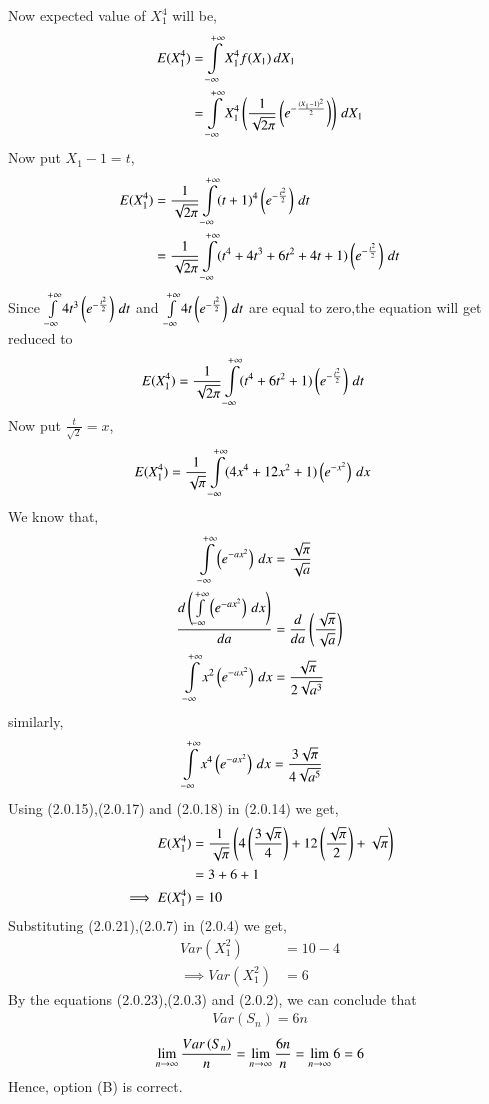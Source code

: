 \documentclass[journal,12pt,twocolumn]{IEEEtran}
\begin{document}
Now expected value of $X_{1}^{4}$ will be,
\begin{align}
   E(X_{1}^4)&=\int\limits_{-\infty}^{+\infty}X_{1}^{4}f(X_{1})\,dX_{1}
\\   &=\int\limits_{-\infty}^{+\infty}X_{1}^{4}\left(\frac{1}{\sqrt{2\pi}}\left(e^{-\frac{(X_{1}-1)^2}{2}}\right)\right)\,dX_{1}
\end{align}
Now put $X_{1}-1=t$,
\begin{align}
    E(X_{1}^4)&=\frac{1}{\sqrt{2\pi}}\int\limits_{-\infty}^{+\infty}(t+1)^{4}\left(e^{-\frac{t^{2}}{2}}\right)\,dt
\\ &=\frac{1}{\sqrt{2\pi}}\int\limits_{-\infty}^{+\infty}(t^{4}+4t^{3}+6t^{2}+4t+1)\left(e^{-\frac{t^{2}}{2}}\right)\,dt
\end{align}
Since $\int\limits_{-\infty}^{+\infty}4t^3\left(e^{-\frac{t^{2}}{2}}\right)\,dt$ and $\int\limits_{-\infty}^{+\infty}4t\left(e^{-\frac{t^{2}}{2}}\right)\,dt$ are equal to zero,the equation will get reduced to
\begin{align}
    E(X_{1}^4)&=\frac{1}{\sqrt{2\pi}}\int\limits_{-\infty}^{+\infty}(t^{4}+6t^{2}+1)\left(e^{-\frac{t^{2}}{2}}\right)\,dt
\end{align}
Now put $\frac{t}{\sqrt{2}}=x$,
\begin{align}
    E(X_{1}^4)&=\frac{1}{\sqrt{\pi}}\int\limits_{-\infty}^{+\infty}(4x^{4}+12x^{2}+1)\left(e^{-x^{2}}\right)\,dx
\end{align}
We know that,
\begin{align}
\int\limits_{-\infty}^{+\infty}\left(e^{-ax^{2}}\right)\,dx&=\frac{\sqrt{\pi}}{\sqrt{a}}
\\\frac{d\left(\int\limits_{-\infty}^{+\infty}\left(e^{-ax^{2}}\right)\,dx\right)}{da}&=\frac{d}{da}\left(\frac{\sqrt{\pi}}{\sqrt{a}}\right)
\\\int\limits_{-\infty}^{+\infty}x^{2}\left(e^{-ax^{2}}\right)\,dx&=\frac{\sqrt{\pi}}{2\sqrt{a^3}}
\end{align}
similarly,
\begin{align}
    \int\limits_{-\infty}^{+\infty}x^{4}\left(e^{-ax^{2}}\right)\,dx&=\frac{3\sqrt{\pi}}{4\sqrt{a^5}}
\end{align}
Using (2.0.15),(2.0.17) and (2.0.18) in (2.0.14) we get,
\begin{align}
     E(X_{1}^4)&=\frac{1}{\sqrt{\pi}}\left(4\left(\frac{3\sqrt{\pi}}{4}\right)+12\left(\frac{\sqrt{\pi}}{2}\right)+\sqrt{\pi}\right)
     \\&=3+6+1
    \\\implies  E(X_{1}^4)&=10
\end{align}
Substituting (2.0.21),(2.0.7) in (2.0.4) we get,
\begin{align}
    Var(X_{1}^{2})&=10-4
    \\\implies Var(X_{1}^{2})&=6
\end{align}
By the equations (2.0.23),(2.0.3) and (2.0.2), we can conclude that 
\begin{align}
    Var(S_{n})=6n
\end{align}
$$\lim_{n \to \infty}{\frac{Var\left(S_{n}\right)}{n}}=\lim_{n \to \infty}{\frac{6n}{n}}=\lim_{n \to \infty}{6}=6$$
Hence, option (B) is correct.
\end{document}
